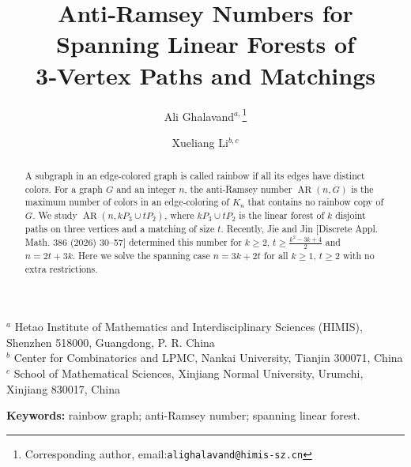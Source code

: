 \documentclass[12pt]{article}
\begin{document}
\title{Anti‑Ramsey Numbers for Spanning Linear Forests of 3‑Vertex Paths and Matchings}

\author{
Ali Ghalavand$^{a,}$\thanks{Corresponding author, email:\texttt{alighalavand@himis-sz.cn}}
\and  Xueliang Li$^{b,c}$}

\maketitle

\begin{center}
$^a$ Hetao Institute of Mathematics and Interdisciplinary Sciences (HIMIS), Shenzhen 518000, Guangdong, P. R. China\\
$^b$ Center for Combinatorics and LPMC, Nankai University, Tianjin 300071, China\\
$^c$ School of Mathematical Sciences, Xinjiang Normal University, Urumchi, Xinjiang 830017, China
\end{center}

\begin{abstract}
A subgraph in an edge-colored graph is called rainbow if all its edges have distinct colors. For a graph \(G\) and an integer \(n\), the anti‑Ramsey number \(\operatorname{AR}(n,G)\) is the maximum number of colors in an edge‑coloring of \(K_n\) that contains no rainbow copy of \(G\). We study \(\operatorname{AR}(n, kP_3 \cup tP_2)\), where \(kP_3 \cup tP_2\) is the linear forest of \(k\) disjoint paths on three vertices and a matching of size \(t\). Recently, Jie and Jin [Discrete Appl. Math. 386 (2026) 30–57] determined this number for \(k\ge 2\), \(t\ge\frac{k^2-3k+4}{2}\) and \(n=2t+3k\). Here we solve the spanning case \(n=3k+2t\) for all \(k\ge1\), \(t\ge2\) with no extra restrictions.
\end{abstract}
\noindent
\textbf{Keywords:} rainbow graph; anti-Ramsey number; spanning linear forest.

\end{document}
